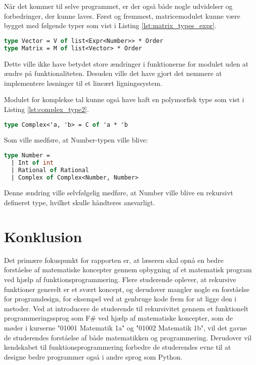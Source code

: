 \documentclass{article}
\newcommand{\newchapter}{
    \cleardoublepage
    \ifthenelse{\isodd{\value{page}}}{}{\hbox{}\newpage}
}
\begin{document}
Når det kommer til selve programmet, er der også både nogle udvidelser og forbedringer, der kunne laves. Først og fremmest, matricemodulet kunne være bygget med følgende typer som vist i Listing \ref{lst:matrix_types_expr}.

\begin{lstlisting}[language={FSharp}, label={lst:matrix_types_expr}, caption={Eksempel på alternative typer for matrixmodulet}]
type Vector = V of list<Expr<Number>> * Order
type Matrix = M of list<Vector> * Order
\end{lstlisting}

Dette ville ikke have betydet store ændringer i funktionerne for modulet uden at ændre på funktionaliteten. Desuden ville det have gjort det nemmere at implementere løsninger til et lineært ligningssystem.

Modulet for komplekse tal kunne også have haft en polymorfisk type som vist i Listing \ref{lst:complex_type2}.

\begin{lstlisting}[language={FSharp}, label={lst:complex_type2}, caption={Eksempel på alternative typer for komplekse tal modulet}]
type Complex<'a, 'b> = C of 'a * 'b
\end{lstlisting}

Som ville medføre, at Number-typen ville blive:

\begin{lstlisting}[language={FSharp}, label={lst:number_type2}, caption={Eksempel på alternative typer for Number-typen}]
type Number = 
  | Int of int 
  | Rational of Rational 
  | Complex of Complex<Number, Number>
\end{lstlisting}

Denne ændring ville selvfølgelig medføre, at Number ville blive en rekursivt defineret type, hvilket skulle håndteres ansvarligt.

\newchapter
\section{Konklusion}

Det primære fokuspunkt for rapporten er, at læseren skal opnå en bedre forståelse af matematiske koncepter gennem opbygning af et matematisk program ved hjælp af funktionsprogrammering. Flere studerende oplever, at rekursive funktioner generelt er et svært koncept, og derudover mangler nogle en forståelse for programdesign, for eksempel ved at genbruge kode frem for at ligge den i metoder. Ved at introducere de studerende til rekursivitet gennem et funktionelt programmeringssprog som F\# ved hjælp af matematiske koncepter, som de møder i kurserne "01001 Matematik 1a" og "01002 Matematik 1b", vil det gavne de studerendes forståelse af både matematikken og programmering. Derudover vil kendskabet til funktionsprogrammering forbedre de studerendes evne til at designe bedre programmer også i andre sprog som Python.
\end{document}
